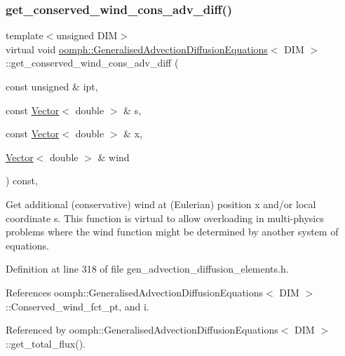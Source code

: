 \subsubsection{\texorpdfstring{get\+\_\+conserved\+\_\+wind\+\_\+cons\+\_\+adv\+\_\+diff()}{get\_conserved\_wind\_cons\_adv\_diff()}}
{\footnotesize\ttfamily template$<$unsigned D\+IM$>$ \\
virtual void \hyperlink{classoomph_1_1GeneralisedAdvectionDiffusionEquations}{oomph\+::\+Generalised\+Advection\+Diffusion\+Equations}$<$ D\+IM $>$\+::get\+\_\+conserved\+\_\+wind\+\_\+cons\+\_\+adv\+\_\+diff (\begin{DoxyParamCaption}\item[{const unsigned \&}]{ipt,  }\item[{const \hyperlink{classoomph_1_1Vector}{Vector}$<$ double $>$ \&}]{s,  }\item[{const \hyperlink{classoomph_1_1Vector}{Vector}$<$ double $>$ \&}]{x,  }\item[{\hyperlink{classoomph_1_1Vector}{Vector}$<$ double $>$ \&}]{wind }\end{DoxyParamCaption}) const\hspace{0.3cm}{\ttfamily [inline]}, {\ttfamily [virtual]}}



Get additional (conservative) wind at (Eulerian) position x and/or local coordinate s. This function is virtual to allow overloading in multi-\/physics problems where the wind function might be determined by another system of equations. 



Definition at line 318 of file gen\+\_\+advection\+\_\+diffusion\+\_\+elements.\+h.



References oomph\+::\+Generalised\+Advection\+Diffusion\+Equations$<$ D\+I\+M $>$\+::\+Conserved\+\_\+wind\+\_\+fct\+\_\+pt, and i.



Referenced by oomph\+::\+Generalised\+Advection\+Diffusion\+Equations$<$ D\+I\+M $>$\+::get\+\_\+total\+\_\+flux().

\mbox{\label{classoomph_1_1GeneralisedAdvectionDiffusionEquations_a1d9266d37b622068414bda1e71f9f090}} 
